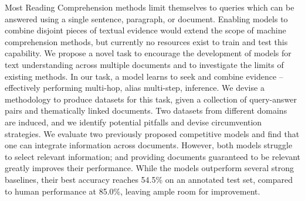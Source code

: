 Most Reading Comprehension methods limit themselves to queries which can be answered using a single sentence, paragraph, or document. Enabling models to combine disjoint pieces of textual evidence would extend the scope of machine comprehension methods, but currently no resources exist to train and test this capability. We propose a novel task to encourage the development of models for text understanding across multiple documents and to investigate the limits of existing methods. In our task, a model learns to seek and combine evidence – effectively performing multi-hop, alias multi-step, inference. We devise a methodology to produce datasets for this task, given a collection of query-answer pairs and thematically linked documents. Two datasets from different domains are induced, and we identify potential pitfalls and devise circumvention strategies. We evaluate two previously proposed competitive models and find that one can integrate information across documents. However, both models struggle to select relevant information; and providing documents guaranteed to be relevant greatly improves their performance. While the models outperform several strong baselines, their best accuracy reaches 54.5\% on an annotated test set, compared to human performance at 85.0\%, leaving ample room for improvement.